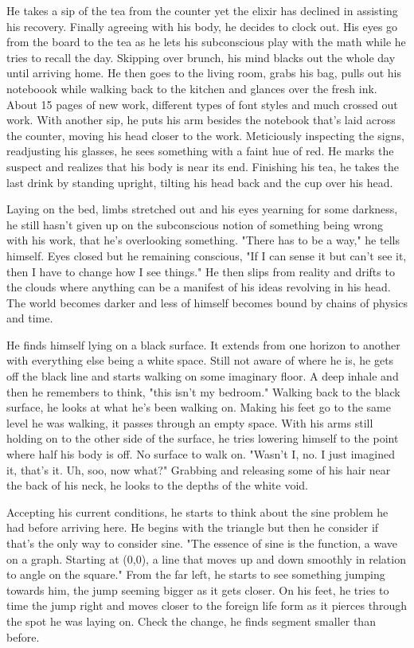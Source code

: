         He takes a sip of the tea from the counter yet the elixir has declined in assisting his recovery. Finally agreeing with his body, he 
    decides to clock out. His eyes go from the board to the tea as he lets his subconscious play with the math while he tries to recall the day.
    Skipping over brunch, his mind blacks out the whole day until arriving home. He then goes to the living room, grabs his bag, pulls out his
    noteboook while walking back to the kitchen and glances over the fresh ink. About 15 pages of new work, different types of font styles and
    much crossed out work. With another sip, he puts his arm besides the notebook that's laid across the counter, moving his head closer to
    the work. Meticiously inspecting the signs, readjusting his glasses, he sees something with a faint hue of red. He marks the suspect and
    realizes that his body is near its end. Finishing his tea, he takes the last drink by standing upright, tilting his head back and the cup 
    over his head.

        Laying on the bed, limbs stretched out and his eyes yearning for some darkness, he still hasn't given up on the subconscious notion of
    something being wrong with his work, that he's overlooking something. "There has to be a way," he tells himself. Eyes closed but he remaining
    conscious, "If I can sense it but can't see it, then I have to change how I see things." He then slips from reality and drifts to the clouds
    where anything can be a manifest of his ideas revolving in his head. The world becomes darker and less of himself becomes bound by chains
    of physics and time.

        He finds himself lying on a black surface. It extends from one horizon to another with everything else being a white space. Still not
    aware of where he is, he gets off the black line and starts walking on some imaginary floor. A deep inhale and then he remembers to think,
    "this isn't my bedroom." Walking back to the black surface, he looks at what he's been walking on. Making his feet go to the same level he
    was walking, it passes through an empty space. With his arms still holding on to the other side of the surface, he tries lowering himself
    to the point where half his body is off. No surface to walk on. "Wasn't I, no. I just imagined it, that's it. Uh, soo, now what?"  Grabbing
    and releasing some of his hair near the back of his neck, he looks to the depths of the white void.

        Accepting his current conditions, he starts to think about the sine problem he had before arriving here. He begins with the triangle but
    then he consider if that's the only way to consider sine. "The essence of sine is the function, a wave on a graph. Starting at (0,0), a 
    line that moves up and down smoothly in relation to angle on the square." From the far left, he starts to see something jumping towards him,
    the jump seeming bigger as it gets closer. On his feet, he tries to time the jump right and moves closer to the foreign life form as it 
    pierces through the spot he was laying on. Check the change, he finds segment smaller than before.

